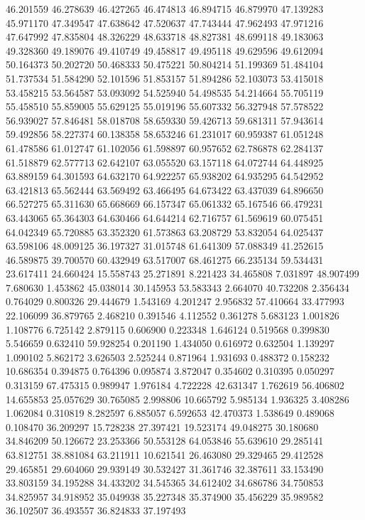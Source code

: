 46.201559
46.278639
46.427265
46.474813
46.894715
46.879970
47.139283
45.971170
47.349547
47.638642
47.520637
47.743444
47.962493
47.971216
47.647992
47.835804
48.326229
48.633718
48.827381
48.699118
49.183063
49.328360
49.189076
49.410749
49.458817
49.495118
49.629596
49.612094
50.164373
50.202720
50.468333
50.475221
50.804214
51.199369
51.484104
51.737534
51.584290
52.101596
51.853157
51.894286
52.103073
53.415018
53.458215
53.564587
53.093092
54.525940
54.498535
54.214664
55.705119
55.458510
55.859005
55.629125
55.019196
55.607332
56.327948
57.578522
56.939027
57.846481
58.018708
58.659330
59.426713
59.681311
57.943614
59.492856
58.227374
60.138358
58.653246
61.231017
60.959387
61.051248
61.478586
61.012747
61.102056
61.598897
60.957652
62.786878
62.284137
61.518879
62.577713
62.642107
63.055520
63.157118
64.072744
64.448925
63.889159
64.301593
64.632170
64.922257
65.938202
64.935295
64.542952
63.421813
65.562444
63.569492
63.466495
64.673422
63.437039
64.896650
66.527275
65.311630
65.668669
66.157347
65.061332
65.167546
66.479231
63.443065
65.364303
64.630466
64.644214
62.716757
61.569619
60.075451
64.042349
65.720885
63.352320
61.573863
63.208729
53.832054
64.025437
63.598106
48.009125
36.197327
31.015748
61.641309
57.088349
41.252615
46.589875
39.700570
60.432949
63.517007
68.461275
66.235134
59.534431
23.617411
24.660424
15.558743
25.271891
8.221423
34.465808
7.031897
48.907499
7.680630
1.453862
45.038014
30.145953
53.583343
2.664070
40.732208
2.356434
0.764029
0.800326
29.444679
1.543169
4.201247
2.956832
57.410664
33.477993
22.106099
36.879765
2.468210
0.391546
4.112552
0.361278
5.683123
1.001826
1.108776
6.725142
2.879115
0.606900
0.223348
1.646124
0.519568
0.399830
5.546659
0.632410
59.928254
0.201190
1.434050
0.616972
0.632504
1.139297
1.090102
5.862172
3.626503
2.525244
0.871964
1.931693
0.488372
0.158232
10.686354
0.394875
0.764396
0.095874
3.872047
0.354602
0.310395
0.050297
0.313159
67.475315
0.989947
1.976184
4.722228
42.631347
1.762619
56.406802
14.655853
25.057629
30.765085
2.998806
10.665792
5.985134
1.936325
3.408286
1.062084
0.310819
8.282597
6.885057
6.592653
42.470373
1.538649
0.489068
0.108470
36.209297
15.728238
27.397421
19.523174
49.048275
30.180680
34.846209
50.126672
23.253366
50.553128
64.053846
55.639610
29.285141
63.812751
38.881084
63.211911
10.621541
26.463080
29.329465
29.412528
29.465851
29.604060
29.939149
30.532427
31.361746
32.387611
33.153490
33.803159
34.195288
34.433202
34.545365
34.612402
34.686786
34.750853
34.825957
34.918952
35.049938
35.227348
35.374900
35.456229
35.989582
36.102507
36.493557
36.824833
37.197493
